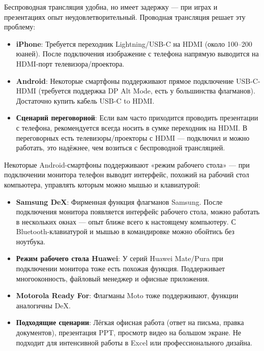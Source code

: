
Беспроводная трансляция удобна, но имеет задержку — при играх и презентациях опыт неудовлетворительный. Проводная трансляция решает эту проблему:

\begin{itemize}
  \item \textbf{iPhone}: Требуется переходник Lightning/USB-C на HDMI (около 100–200 юаней). После подключения изображение с телефона напрямую выводится на HDMI-порт телевизора/проектора.
  \item \textbf{Android}: Некоторые смартфоны поддерживают прямое подключение USB-C-HDMI (требуется поддержка DP Alt Mode, есть у большинства флагманов). Достаточно купить кабель USB-C to HDMI.
  \item \textbf{Сценарий переговорной}: Если вам часто приходится проводить презентации с телефона, рекомендуется всегда носить в сумке переходник на HDMI. В переговорных есть телевизоры/проекторы с HDMI — подключил и можно работать, это надёжнее, чем возиться с беспроводной трансляцией.
\end{itemize}


Некоторые Android-смартфоны поддерживают «режим рабочего стола» — при подключении монитора телефон выводит интерфейс, похожий на рабочий стол компьютера, управлять которым можно мышью и клавиатурой:

\begin{itemize}
  \item \textbf{Samsung DeX}: Фирменная функция флагманов Samsung. После подключения монитора появляется интерфейс рабочего стола, можно работать в нескольких окнах — опыт ближе всего к настоящему компьютеру. С Bluetooth-клавиатурой и мышью в командировке можно обойтись без ноутбука.
  \item \textbf{Режим рабочего стола Huawei}: У серий Huawei Mate/Pura при подключении монитора тоже есть похожая функция. Поддерживает многооконность, файловый менеджер и офисные приложения.
  \item \textbf{Motorola Ready For}: Флагманы Moto тоже поддерживают, функции аналогичны DeX.
  \item \textbf{Подходящие сценарии}: Лёгкая офисная работа (ответ на письма, правка документов), презентация PPT, просмотр видео на большом экране. Не подходит для интенсивной работы в Excel или профессионального дизайна.
\end{itemize}


